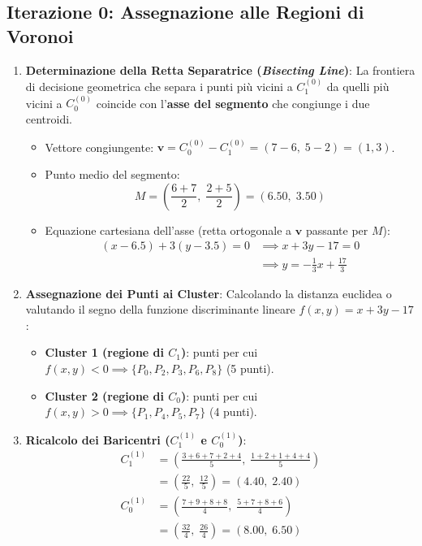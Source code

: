 \subsection{Iterazione 0: Assegnazione alle Regioni di Voronoi}
\begin{enumerate}[label=\textbf{\arabic*.}]
    \item \textbf{Determinazione della Retta Separatrice (\textit{Bisecting Line})}:
    La frontiera di decisione geometrica che separa i punti più vicini a $C_1^{(0)}$ da quelli più vicini a $C_0^{(0)}$ coincide con l'\textbf{asse del segmento} che congiunge i due centroidi.
    \begin{itemize}
        \item Vettore congiungente: $\mathbf{v} = C_0^{(0)} - C_1^{(0)} = (7 - 6, \; 5 - 2) = (1, 3)$.
        \item Punto medio del segmento:
        \begin{equation}
        M = \left( \frac{6 + 7}{2}, \; \frac{2 + 5}{2} \right) = (6.50, \; 3.50)
        \end{equation}
        \item Equazione cartesiana dell'asse (retta ortogonale a $\mathbf{v}$ passante per $M$):
        \begin{align}
        (x - 6.5) + 3(y - 3.5) = 0 &\implies x + 3y - 17 = 0 \nonumber \\
        &\implies y = -\frac{1}{3}x + \frac{17}{3}
        \end{align}
    \end{itemize}

    \item \textbf{Assegnazione dei Punti ai Cluster}:
    Calcolando la distanza euclidea o valutando il segno della funzione discriminante lineare $f(x, y) = x + 3y - 17$:
    \begin{itemize}
        \item \textbf{Cluster 1 (regione di $C_1$)}: punti per cui $f(x, y) < 0 \implies \{P_0, P_2, P_3, P_6, P_8\}$ (5 punti).
        \item \textbf{Cluster 2 (regione di $C_0$)}: punti per cui $f(x, y) > 0 \implies \{P_1, P_4, P_5, P_7\}$ (4 punti).
    \end{itemize}

    \item \textbf{Ricalcolo dei Baricentri ($C_1^{(1)}$ e $C_0^{(1)}$)}:
    \begin{align}
    C_1^{(1)} &= \left( \frac{3 + 6 + 7 + 2 + 4}{5}, \; \frac{1 + 2 + 1 + 4 + 4}{5} \right) \nonumber \\
              &= \left( \frac{22}{5}, \; \frac{12}{5} \right) = (4.40, \; 2.40) \\[4pt]
    C_0^{(1)} &= \left( \frac{7 + 9 + 8 + 8}{4}, \; \frac{5 + 7 + 8 + 6}{4} \right) \nonumber \\
              &= \left( \frac{32}{4}, \; \frac{26}{4} \right) = (8.00, \; 6.50)
    \end{align}
\end{enumerate}

